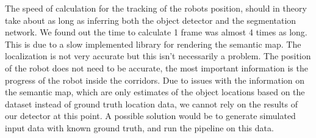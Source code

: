The speed of calculation for the tracking of the robots position, should in theory take about as long as inferring both the
object detector and the segmentation network.
We found out the time to calculate 1 frame was almost 4 times as long.
This is due to a slow implemented library for rendering the semantic map.
The localization is not very accurate but this isn't necessarily a problem.
The position of the robot does not need to be accurate, the most important information is the progress of the robot inside the corridors.
Due to issues with the information on the semantic map, which are only estimates of the object locations based on the dataset instead of
ground truth location data, we cannot rely on the results of our detector at this point.
A possible solution would be to generate simulated input data with known ground truth, and run the pipeline on this data.


%
